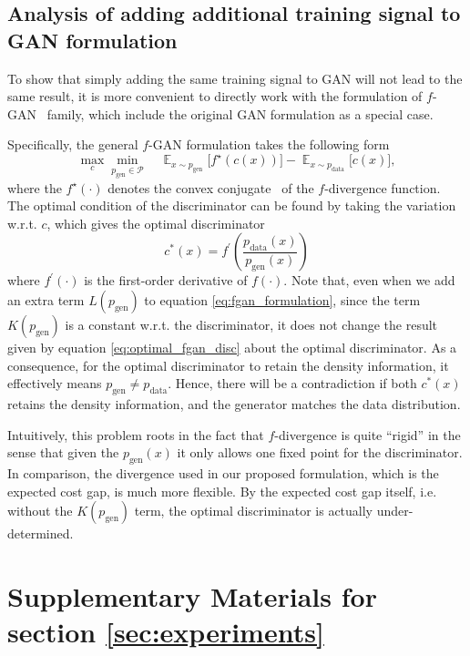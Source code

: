 \documentclass[a4paper]{article}
\newcommand{\pd}{p_\text{data}}
\newcommand{\pg}{p_\text{gen}}
\DeclareMathOperator*{\E}{\mathbb{E}}
\begin{document}
\subsection{Analysis of adding additional training signal to GAN formulation}
\label{sec:fgan_reg}
To show that simply adding the same training signal to GAN will not lead to the same result, it is more convenient to directly work with the formulation of $f$-GAN~\citep[equation (6)]{nowozin2016f} family, which include the original GAN formulation as a special case.

Specifically, the general $f$-GAN formulation takes the following form
\begin{equation}
\label{eq:fgan_formulation}
\max_{c} \min_{\pg \in \mathcal{P}} \quad
	\E_{x \sim \pg} \big[ f^\star(c(x)) \big] - 
    \E_{x \sim \pd} \big[ c(x) \big],
\end{equation}
where the $f^\star(\cdot)$ denotes the convex conjugate~\citep{boyd2004convex} of the $f$-divergence function.
The optimal condition of the discriminator can be found by taking the variation w.r.t. $c$, which gives the optimal discriminator 
\begin{equation}
\label{eq:optimal_fgan_disc}
c^*(x) = f^\prime(\frac{\pd(x)}{\pg(x)})
\end{equation}
where $f^\prime(\cdot)$ is the first-order derivative of $f(\cdot)$.
Note that, even when we add an extra term $L(\pg)$ to equation \eqref{eq:fgan_formulation}, since the term $K(\pg)$ is a constant w.r.t. the discriminator, it does not change the result given by equation \eqref{eq:optimal_fgan_disc} about the optimal discriminator. 
As a consequence, for the optimal discriminator to retain the density information, it effectively means $\pg \neq \pd$.
Hence, there will be a contradiction if both $c^*(x)$ retains the density information, and the generator matches the data distribution.

Intuitively, this problem roots in the fact that $f$-divergence is quite ``rigid'' in the sense that given the $\pg(x)$ it only allows one fixed point for the discriminator.
In comparison, the divergence used in our proposed formulation, which is the expected cost gap, is much more flexible.
By the expected cost gap itself, i.e. without the $K(\pg)$ term, the optimal discriminator is actually under-determined.
 \section{Supplementary Materials for section \ref{sec:experiments}}
\end{document}
